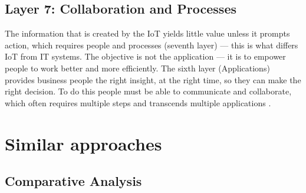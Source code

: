 \subsection{Layer 7: Collaboration and Processes}
\label{sec:iot-model-layer7}

The information that is created by the \acs{IoT} yields little value unless it prompts action, which requires people and processes (seventh layer) — this is what differs \acs{IoT} from \acl{IT} systems. The objective is not the application — it is to empower people to work better and more efficiently. The sixth layer (Applications) provides business people the right insight, at the right time, so they can make the right decision. To do this people must be able to communicate and collaborate, which often requires multiple steps and transcends multiple applications \cite{Cisco2014}.




\section{Similar approaches}



\subsection{Comparative Analysis}

